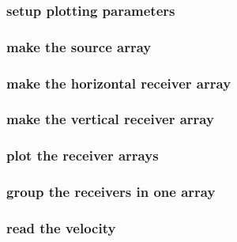 \begin{frame} \frametitle{setup plotting parameters}
  \normalsize
  \blueshade{
    
  }
\end{frame}
\cwpnote{}

\begin{frame} \frametitle{make the source array}
  \normalsize
  \blueshade{
    
  }
\end{frame}
\cwpnote{}

\begin{frame} \frametitle{make the horizontal receiver array}
  \normalsize
  \blueshade{
    
  }
\end{frame}
\cwpnote{}

\begin{frame} \frametitle{make the vertical receiver array}
  \normalsize
  \blueshade{
    
  }
\end{frame}
\cwpnote{}

\begin{frame} \frametitle{plot the receiver arrays}
  \normalsize
  \blueshade{
    
  }
\end{frame}
\cwpnote{}

\begin{frame}  \end{frame}

\begin{frame} \frametitle{group the receivers in one array}
  \normalsize
  \blueshade{
    
  }
\end{frame}
\cwpnote{}

\begin{frame} \frametitle{read the velocity}
  \normalsize
  \blueshade{
    
  }
\end{frame}
\cwpnote{}

